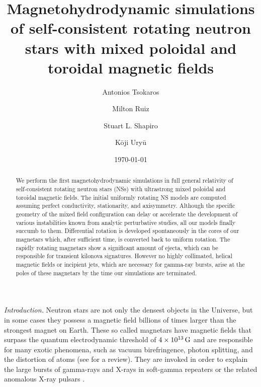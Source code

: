 \documentclass[twocolumn,superscriptaddress,showpacs,prl,aps,amsmath,amssymb,nofootinbib]{revtex4-1}
\begin{document}
\title{Magnetohydrodynamic simulations of self-consistent rotating neutron stars with mixed poloidal 
and toroidal magnetic fields}



\author{Antonios Tsokaros}

\author{Milton Ruiz}
%
\author{Stuart L. Shapiro}
%
\author{K\=oji Ury\=u}


\date{\today}

\begin{abstract}
We perform the first magnetohydrodynamic simulations in full general relativity of
self-consistent rotating neutron stars (NSs) with ultrastrong mixed poloidal and toroidal
magnetic fields. The initial uniformly rotating NS models are computed
assuming perfect conductivity, stationarity, and axisymmetry.
Although the specific geometry of the mixed field configuration can delay or
accelerate the development of various instabilities known from analytic
perturbative studies, all our models finally succumb to them. Differential
rotation is developed spontaneously in the cores of our magnetars which, after
sufficient time, is converted back to uniform rotation.  The rapidly rotating
magnetars show a significant amount of ejecta, which can be responsible for
transient kilonova signatures. However no highly collimated, helical magnetic
fields or incipient jets, which are necessary for gamma-ray bursts,  arise at
the poles of these magnetars by the time our simulations are terminated.
\end{abstract}

\maketitle




\textit{Introduction.}\textemdash
Neutron stars are not only the densest objects in the Universe, but in some cases
they possess a magnetic field billions of times larger than the strongest magnet
on Earth. These so called magnetars \cite{Duncan1992,ThompsonDuncan1993,ThompsonDuncan1996}
have magnetic fields that surpass the quantum electrodynamic threshold
of $4\times 10^{13}\,\rm G$ and are responsible for many exotic phenomena,
such as vacuum birefringence, photon splitting, and the distortion of atoms
(see \cite{Harding2006} for a review). They are invoked in order to explain
the large bursts of gamma-rays and X-rays in soft-gamma repeaters \cite{Kouveliotou1998} 
or the related anomalous X-ray pulsars \cite{Gavriil2002}.
\end{document}
